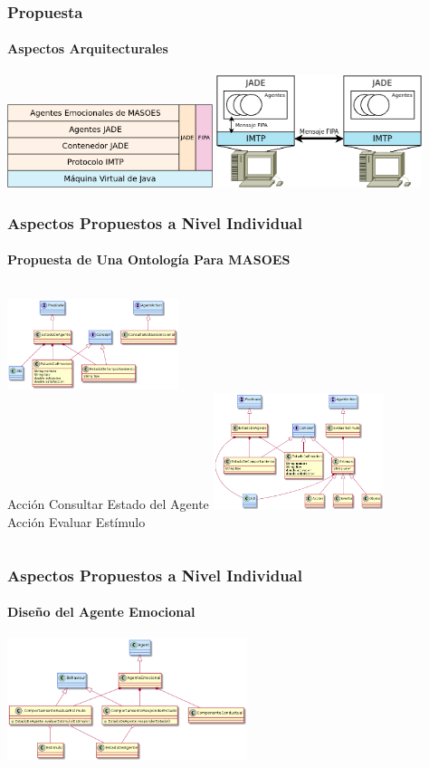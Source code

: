 \documentclass{beamer}
\begin{document}
\begin{frame}
\frametitle{Propuesta}
\framesubtitle{Aspectos Arquitecturales}
\centering
\includegraphics[width=6cm]{ilustraciones/arquitectura}
\vfill
\includegraphics[width=6cm]{ilustraciones/comunicacion-entre-hosts}
\end{frame}

\begin{frame}
\frametitle{Aspectos Propuestos a Nivel Individual}
\framesubtitle{Propuesta de Una Ontología Para MASOES}
\begin{columns}
\centering
\tiny
\includegraphics[width=5cm]{ilustraciones/ontologia-masoes-estado}
\\
Acción Consultar Estado del Agente
\centering
\tiny
\includegraphics[width=5cm]{ilustraciones/ontologia-masoes-estimulo}
\\
Acción Evaluar Estímulo
\end{columns}
\end{frame}

\begin{frame}
\frametitle{Aspectos Propuestos a Nivel Individual}
\framesubtitle{Diseño del Agente Emocional}
\centering
\includegraphics[width=7cm]{ilustraciones/diseno-nivel-individual}
\end{frame}
\end{document}
